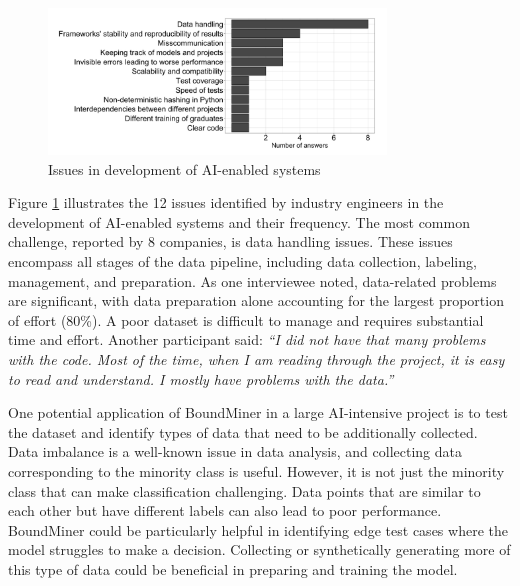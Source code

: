 \documentclass[11pt]{article}
\begin{document}
\begin{figure}[h]
    \centering
    \includegraphics[width=0.8\textwidth]{issues.png}
    \caption{Issues in development of AI-enabled systems}
    \label{fig:issues}
\end{figure}

Figure \ref{fig:issues} illustrates the 12 issues identified by industry engineers in the development of AI-enabled systems and their frequency. The most common challenge, reported by 8 companies, is data handling issues. These issues encompass all stages of the data pipeline, including data collection, labeling, management, and preparation. As one interviewee noted, data-related problems are significant, with data preparation alone accounting for the largest proportion of effort (80\%). A poor dataset is difficult to manage and requires substantial time and effort. Another participant said: \textit{“I did not have that many problems with the code. Most of the time, when I am reading through the project, it is easy to read and understand. I mostly have problems with the data.”}

One potential application of BoundMiner in a large AI-intensive project is to test the dataset and identify types of data that need to be additionally collected. Data imbalance is a well-known issue in data analysis, and collecting data corresponding to the minority class is useful. However, it is not just the minority class that can make classification challenging. Data points that are similar to each other but have different labels can also lead to poor performance. BoundMiner could be particularly helpful in identifying edge test cases where the model struggles to make a decision. Collecting or synthetically generating more of this type of data could be beneficial in preparing and training the model.
\end{document}
